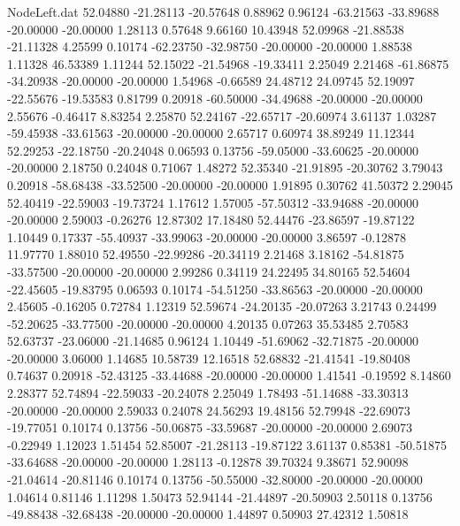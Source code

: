 \begin{filecontents}{NodeLeft.dat}
  52.04880  -21.28113  -20.57648     0.88962    0.96124  -63.21563  -33.89688  -20.00000  -20.00000    1.28113    0.57648    9.66160   10.43948
  52.09968  -21.88538  -21.11328     4.25599    0.10174  -62.23750  -32.98750  -20.00000  -20.00000    1.88538    1.11328   46.53389    1.11244
  52.15022  -21.54968  -19.33411     2.25049    2.21468  -61.86875  -34.20938  -20.00000  -20.00000    1.54968   -0.66589   24.48712   24.09745
  52.19097  -22.55676  -19.53583     0.81799    0.20918  -60.50000  -34.49688  -20.00000  -20.00000    2.55676   -0.46417    8.83254    2.25870
  52.24167  -22.65717  -20.60974     3.61137    1.03287  -59.45938  -33.61563  -20.00000  -20.00000    2.65717    0.60974   38.89249   11.12344
  52.29253  -22.18750  -20.24048     0.06593    0.13756  -59.05000  -33.60625  -20.00000  -20.00000    2.18750    0.24048    0.71067    1.48272
  52.35340  -21.91895  -20.30762     3.79043    0.20918  -58.68438  -33.52500  -20.00000  -20.00000    1.91895    0.30762   41.50372    2.29045
  52.40419  -22.59003  -19.73724     1.17612    1.57005  -57.50312  -33.94688  -20.00000  -20.00000    2.59003   -0.26276   12.87302   17.18480
  52.44476  -23.86597  -19.87122     1.10449    0.17337  -55.40937  -33.99063  -20.00000  -20.00000    3.86597   -0.12878   11.97770    1.88010
  52.49550  -22.99286  -20.34119     2.21468    3.18162  -54.81875  -33.57500  -20.00000  -20.00000    2.99286    0.34119   24.22495   34.80165
  52.54604  -22.45605  -19.83795     0.06593    0.10174  -54.51250  -33.86563  -20.00000  -20.00000    2.45605   -0.16205    0.72784    1.12319
  52.59674  -24.20135  -20.07263     3.21743    0.24499  -52.20625  -33.77500  -20.00000  -20.00000    4.20135    0.07263   35.53485    2.70583
  52.63737  -23.06000  -21.14685     0.96124    1.10449  -51.69062  -32.71875  -20.00000  -20.00000    3.06000    1.14685   10.58739   12.16518
  52.68832  -21.41541  -19.80408     0.74637    0.20918  -52.43125  -33.44688  -20.00000  -20.00000    1.41541   -0.19592    8.14860    2.28377
  52.74894  -22.59033  -20.24078     2.25049    1.78493  -51.14688  -33.30313  -20.00000  -20.00000    2.59033    0.24078   24.56293   19.48156
  52.79948  -22.69073  -19.77051     0.10174    0.13756  -50.06875  -33.59687  -20.00000  -20.00000    2.69073   -0.22949    1.12023    1.51454
  52.85007  -21.28113  -19.87122     3.61137    0.85381  -50.51875  -33.64688  -20.00000  -20.00000    1.28113   -0.12878   39.70324    9.38671
  52.90098  -21.04614  -20.81146     0.10174    0.13756  -50.55000  -32.80000  -20.00000  -20.00000    1.04614    0.81146    1.11298    1.50473
  52.94144  -21.44897  -20.50903     2.50118    0.13756  -49.88438  -32.68438  -20.00000  -20.00000    1.44897    0.50903   27.42312    1.50818

\end{filecontents}
